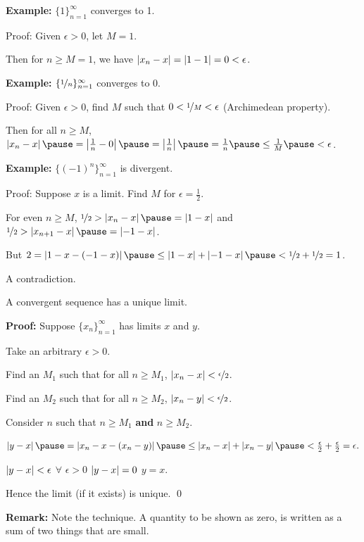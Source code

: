 \documentclass[10pt,aspectratio=149]{beamer}
\begin{document}
\begin{frame}
\textbf{Example:}
$\{ 1 \}_{n=1}^\infty$ converges to 1.  \pause 

Proof: Given $\epsilon > 0$, let $M=1$.

\pause
Then for $n \geq M=1$, we have
$\left\lvert {x_n-x} \right\rvert = \left\lvert {1-1} \right\rvert = 0 < \epsilon$.

\medskip
\pause

\textbf{Example:}
$\{ \nicefrac{1}{n} \}_{n=1}^\infty$ converges to 0.

\pause
Proof: Given $\epsilon > 0$, find $M$ such that
$0 < \nicefrac{1}{M} < \epsilon$ (Archimedean property).

\pause
Then for all $n \geq M$,
\quad
$\abs{x_n - x}
\pause
= \abs{\frac{1}{n} - 0}
\pause
= \abs{\frac{1}{n}}
\pause
= \frac{1}{n}
\pause
\leq \frac{1}{M}
\pause < \epsilon$.

\medskip
\pause

\textbf{Example:}
$\{ {(-1)}^n \}_{n=1}^\infty$ is divergent.

\pause
Proof: Suppose $x$ is a limit.  Find $M$ for $\epsilon = \frac{1}{2}$.

\pause
For even $n \geq M$,
\quad
$\nicefrac{1}{2} > \abs{x_n - x} \pause  = \abs{1 - x}$
\pause
\quad  and \quad 
$\nicefrac{1}{2} > \abs{x_{n+1} - x} \pause  = \abs{-1 - x}$.

\pause
But
\quad
$2 = \abs{1 - x - (-1 -x)} \pause \leq \abs{1 - x} + \abs{-1 -x} \pause <
\nicefrac{1}{2} + \nicefrac{1}{2} = 1$.

\pause
A contradiction.
\end{frame}

\begin{frame}

\begin{proposition}
A convergent sequence has a unique limit.
\end{proposition}

\pause

\textbf{Proof:}
Suppose $\{ x_n \}_{n=1}^\infty$ has limits $x$ and $y$.

\pause
Take an arbitrary $\epsilon > 0$.

\pause
Find an $M_1$ such that for all $n \geq M_1$,
\quad
$\left\lvert {x_n-x} \right\rvert < \nicefrac{\epsilon}{2}$.


\pause
Find an $M_2$ such that for all $n \geq M_2$,
\quad
$\left\lvert {x_n-y} \right\rvert < \nicefrac{\epsilon}{2}$.

\pause
Consider $n$ such that $n \geq M_1$ \textbf{and} $n \geq M_2$.

\pause
$
\abs{y-x}
\pause =
\abs{x_n-x - (x_n -y)}
\pause \leq
\abs{x_n-x} + \abs{x_n -y}
\pause <
\frac{\epsilon}{2} + \frac{\epsilon}{2} = \epsilon .
$

\pause
$\left\lvert {y-x} \right\rvert < \epsilon$ $\forall$  $\epsilon > 0$ \wthus $\left\lvert {y-x} \right\rvert = 0$
\pause
\wthus $y=x$.

\pause
Hence the limit (if it exists) is unique.
\qed

\medskip
\pause

\textbf{Remark:} Note the technique.  A quantity to be shown as zero, is
written as a sum of two things that are small.
\end{frame}
\end{document}

